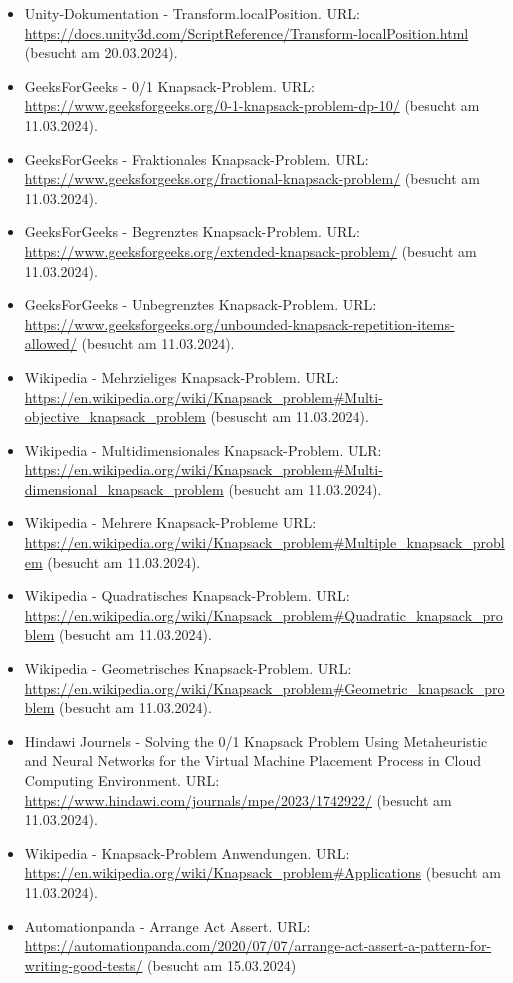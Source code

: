 \begin{itemize}
    \item Unity-Dokumentation - Transform.localPosition. URL: \url{https://docs.unity3d.com/ScriptReference/Transform-localPosition.html} (besucht am 20.03.2024).
    \item GeeksForGeeks - 0/1 Knapsack-Problem. URL: \url{https://www.geeksforgeeks.org/0-1-knapsack-problem-dp-10/} (besucht am 11.03.2024).
    \item GeeksForGeeks - Fraktionales Knapsack-Problem. URL: \url{https://www.geeksforgeeks.org/fractional-knapsack-problem/} (besucht am 11.03.2024).
    \item GeeksForGeeks - Begrenztes Knapsack-Problem. URL: \url{https://www.geeksforgeeks.org/extended-knapsack-problem/} (besucht am 11.03.2024).
    \item GeeksForGeeks - Unbegrenztes Knapsack-Problem. URL: \url{https://www.geeksforgeeks.org/unbounded-knapsack-repetition-items-allowed/} (besucht am 11.03.2024).
    \item Wikipedia - Mehrzieliges Knapsack-Problem. URL: \url{https://en.wikipedia.org/wiki/Knapsack_problem#Multi-objective_knapsack_problem} (besuscht am 11.03.2024).
    \item Wikipedia - Multidimensionales Knapsack-Problem. ULR: \url{https://en.wikipedia.org/wiki/Knapsack_problem#Multi-dimensional_knapsack_problem} (besucht am 11.03.2024).
    \item Wikipedia - Mehrere Knapsack-Probleme URL: \url{https://en.wikipedia.org/wiki/Knapsack_problem#Multiple_knapsack_problem} (besucht am 11.03.2024).
    \item Wikipedia - Quadratisches Knapsack-Problem. URL: \url{https://en.wikipedia.org/wiki/Knapsack_problem#Quadratic_knapsack_problem} (besucht am 11.03.2024).
    \item Wikipedia - Geometrisches Knapsack-Problem. URL: \url{https://en.wikipedia.org/wiki/Knapsack_problem#Geometric_knapsack_problem} (besucht am 11.03.2024).
    \item Hindawi Journels - Solving the 0/1 Knapsack Problem Using Metaheuristic and Neural Networks for the Virtual Machine Placement Process in Cloud Computing Environment. URL: \url{https://www.hindawi.com/journals/mpe/2023/1742922/} (besucht am 11.03.2024).
    \item Wikipedia - Knapsack-Problem Anwendungen. URL: \url{https://en.wikipedia.org/wiki/Knapsack_problem#Applications} (besucht am 11.03.2024).
    \item Automationpanda - Arrange Act Assert. URL: \url{https://automationpanda.com/2020/07/07/arrange-act-assert-a-pattern-for-writing-good-tests/} (besucht am 15.03.2024)
\end{itemize}
